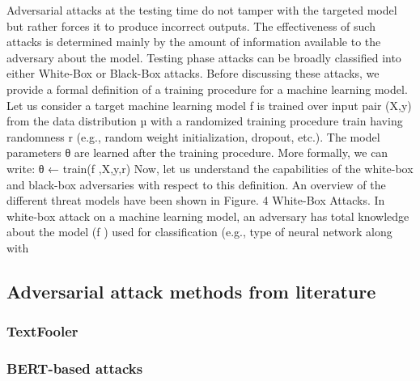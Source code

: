 
Adversarial attacks at the testing time do not tamper with the targeted model but rather forces it to produce incorrect outputs. The effectiveness of such attacks
is determined mainly by the amount of information available to the adversary about the model.
Testing phase attacks can be broadly classified into either White-Box or Black-Box attacks. Before
discussing these attacks, we provide a formal definition of a training procedure for a machine
learning model.
Let us consider a target machine learning model f is trained over input pair (X,y) from the
data distribution µ with a randomized training procedure train having randomness r (e.g., random
weight initialization, dropout, etc.). The model parameters θ are learned after the training procedure.
More formally, we can write:
θ ← train(f ,X,y,r)
Now, let us understand the capabilities of the white-box and black-box adversaries with respect
to this definition. An overview of the different threat models have been shown in Figure. 4
White-Box Attacks. In white-box attack on a machine learning model, an adversary has total
knowledge about the model (f ) used for classification (e.g., type of neural network along with

\subsection{Adversarial attack methods from literature}\label{subsec:aam-from-literature}

\subsubsection{TextFooler}\label{subsubsec:textfooler}

\subsubsection{BERT-based attacks}\label{subsubsec:bert-based-attacks}